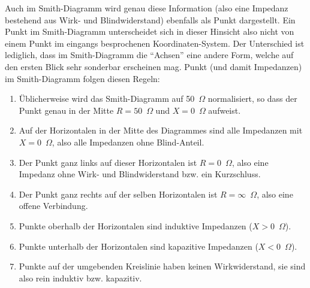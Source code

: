 \documentclass[twoside,a4paper,11pt,halfparskip,DIV=11,notitlepage]{scrartcl}
\newcommand{\Ohm}{$\Omega$\xspace}
\begin{document}
Auch im Smith-Diagramm wird genau diese Information (also eine Impedanz bestehend aus Wirk- und Blindwiderstand)
ebenfalls als Punkt dargestellt. Ein Punkt im Smith-Diagramm unterscheidet sich in dieser Hinsicht also nicht
von einem Punkt im eingangs besprochenen Koordinaten-System. Der Unterschied ist lediglich, dass im Smith-Diagramm
die ``Achsen'' eine andere Form, welche auf den ersten Blick sehr sonderbar erscheinen mag. Punkt (und damit Impedanzen)
im Smith-Diagramm folgen diesen Regeln:


\begin{enumerate}
\item Üblicherweise wird das Smith-Diagramm auf 50~$\Omega$ normalisiert, so dass
    der Punkt genau in der Mitte $R=50$~\Ohm und $X=0$~\Ohm aufweist.
\item Auf der Horizontalen in der Mitte des Diagrammes sind alle Impedanzen mit $X=0$~\Ohm, also alle Impedanzen
    ohne Blind-Anteil.
\item Der Punkt ganz links auf dieser Horizontalen ist $R=0$~\Ohm, also eine Impedanz ohne Wirk- und Blindwiderstand
    bzw. ein Kurzschluss.
\item Der Punkt ganz rechts auf der selben Horizontalen ist $R=\infty$~\Ohm, also eine offene Verbindung.
\item Punkte oberhalb der Horizontalen sind induktive Impedanzen ($X>0$~\Ohm).
\item Punkte unterhalb der Horizontalen sind kapazitive Impedanzen ($X<0$~\Ohm).
\item Punkte auf der umgebenden Kreislinie haben keinen Wirkwiderstand, sie sind also rein induktiv bzw. kapazitiv.
\end{enumerate}
\end{document}
